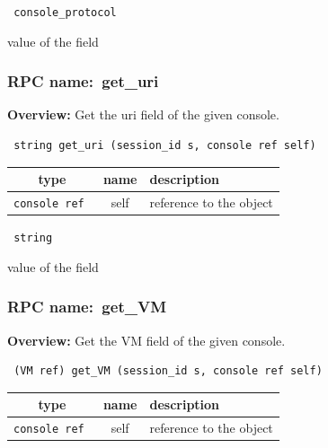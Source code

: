 \vspace{0.3cm}

{\tt 
console\_protocol
}


value of the field
\vspace{0.3cm}
\vspace{0.3cm}
\vspace{0.3cm}
\subsubsection{RPC name:~get\_uri}

{\bf Overview:} 
Get the uri field of the given console.

\begin{verbatim} string get_uri (session_id s, console ref self)\end{verbatim}



 
\vspace{0.3cm}
\begin{tabular}{|c|c|p{7cm}|}
 \hline
{\bf type} & {\bf name} & {\bf description} \\ \hline
{\tt console ref } & self & reference to the object \\ \hline 

\end{tabular}

\vspace{0.3cm}

{\tt 
string
}


value of the field
\vspace{0.3cm}
\vspace{0.3cm}
\vspace{0.3cm}
\subsubsection{RPC name:~get\_VM}

{\bf Overview:} 
Get the VM field of the given console.

\begin{verbatim} (VM ref) get_VM (session_id s, console ref self)\end{verbatim}



 
\vspace{0.3cm}
\begin{tabular}{|c|c|p{7cm}|}
 \hline
{\bf type} & {\bf name} & {\bf description} \\ \hline
{\tt console ref } & self & reference to the object \\ \hline 

\end{tabular}

